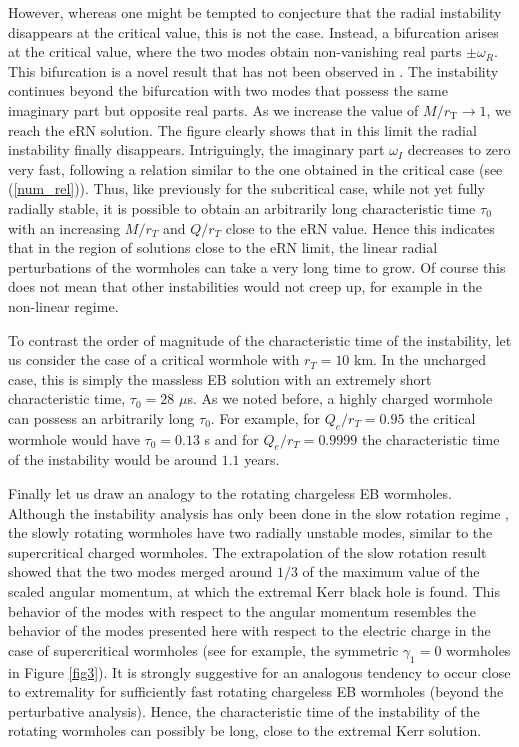 \documentclass[floats,floatfix,showpacs,amssymb,prd,superscriptaddress,nofootinbib,nolongbibliography,reprint]{revtex4-2}
\begin{document}
%

However, whereas one might be tempted to conjecture that the radial instability disappears at the critical value, this is not the case.
Instead, a bifurcation arises at the critical value, where the two modes obtain non-vanishing real parts $\pm \omega_R$.
This bifurcation is a novel result that has not been observed in \cite{Gonzalez:2009hn}.
The instability continues beyond the bifurcation with two modes that possess the same imaginary part but opposite real parts.
As we increase the value of $M/r_\text{T} \to 1$, we reach 
the eRN solution.
The figure clearly shows that in this limit the radial instability finally disappears.
Intriguingly, the imaginary part $\omega_I$ decreases to zero very fast, following a relation similar to the one obtained in the critical case (see (\ref{num_rel})).
Thus, 
like previously for the subcritical case,
while not yet fully radially stable, it is 
possible to obtain an arbitrarily long 
{
characteristic time
}
$\tau_0$ 
with an increasing
$M/r_T$ and $Q/r_T$ close to the eRN value. Hence this indicates that in the region of solutions close to the eRN limit, 
{
the linear radial perturbations of the wormholes can take a very long time to grow.
Of course this does not mean that other instabilities 
would not creep up, for example in the non-linear regime.}




To contrast
the order of magnitude of 
{
the characteristic time of the instability,
}
let us consider the case of a critical wormhole with $r_T=10$ km. In the uncharged case, this is simply the massless EB solution with an extremely short
{
characteristic time,
}
$\tau_0 = 28$  $\mu$s. 
As we noted before, a highly 
charged wormhole can 
{
possess an arbitrarily long $\tau_0$.
}
For example, for $Q_e/r_T=0.95$ the critical wormhole would 
{
have
}
$\tau_0=0.13$ s
and for $Q_e/r_T=0.9999$ the {
characteristic time of the instability
}
would be around $1.1$ years.

%



Finally let us draw an analogy to the rotating chargeless EB wormholes.
Although the instability analysis has only been done in the slow rotation regime \cite{Azad:2023iju,Azad:2024axu}, the slowly rotating wormholes have two radially unstable modes, similar to the supercritical charged wormholes. The extrapolation of the slow rotation result showed that the two modes 
merged
around $1/3$ of the maximum value of the scaled angular momentum, 
at
which the extremal Kerr black hole is found. 
This behavior of the modes 
with respect to
the angular momentum 
resembles
the behavior of the modes presented here with respect to the electric charge in the case of supercritical wormholes (see for example, the symmetric $\gamma_1=0$ wormholes in Figure \ref{fig3}). 
It is strongly suggestive for an analogous tendency to occur
close to extremality
for sufficiently fast rotating chargeless
EB
wormholes (beyond the perturbative analysis).
Hence, the  
{
characteristic time of the instability 
}
of the rotating wormholes can possibly be long, close to the extremal Kerr solution.
\end{document}
